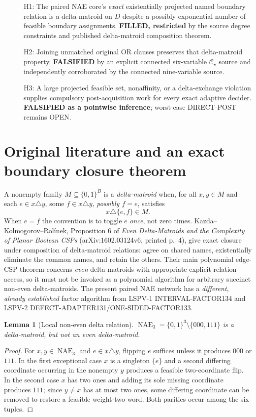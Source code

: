 \documentclass[11pt]{article}
\newtheorem{lemma}[theorem]{Lemma}
\newcommand{\CS}{\mathcal C_{\star}}
\newcommand{\NAE}{\operatorname{NAE}}
\begin{document}
\begin{description}
\item[] H1: The paired NAE core's \emph{exact} existentially projected named boundary relation is a delta-matroid on $D$ despite a possibly exponential number of feasible boundary assignments. \textbf{FILLED, restricted} by the source degree constraints and published delta-matroid composition theorem.
\item[] H2: Joining unmatched original OR clauses preserves that delta-matroid property. \textbf{FALSIFIED} by an explicit connected six-variable $\CS$ source and independently corroborated by the connected nine-variable source.
\item[] H3: A large projected feasible set, nonaffinity, or a delta-exchange violation supplies compulsory post-acquisition work for every exact adaptive decider. \textbf{FALSIFIED as a pointwise inference}; worst-case DIRECT-POST remains OPEN.
\end{description}

\section{Original literature and an exact boundary closure theorem}
A nonempty family $M\subseteq\{0,1\}^B$ is a \emph{delta-matroid} when, for all $x,y\in M$ and each $e\in x\triangle y$, some $f\in x\triangle y$, \emph{possibly $f=e$}, satisfies
\[
x\triangle\{e,f\}\in M.
\]
When $e=f$ the convention is to toggle $e$ \emph{once}, not zero times. Kazda--Kolmogorov--Rol\'inek, Proposition 6 of \emph{Even Delta-Matroids and the Complexity of Planar Boolean CSPs} (arXiv:1602.03124v6, printed p.~4), give exact closure under composition of delta-matroid relations: agree on shared names, existentially eliminate the common names, and retain the others. Their main polynomial edge-CSP theorem concerns \emph{even} delta-matroids with appropriate explicit relation access, so it must not be invoked as a polynomial algorithm for arbitrary succinct non-even delta-matroids. The present paired NAE network has a \emph{different, already established} factor algorithm from LSPV-1 INTERVAL-FACTOR134 and LSPV-2 DEFECT-ADAPTER131/ONE-SIDED-FACTOR133.

\begin{lemma}[Local non-even delta relation]
$\NAE_3=\{0,1\}^3\setminus\{000,111\}$ is a delta-matroid, but not an even delta-matroid.
\end{lemma}
\begin{proof}
For $x,y\in\NAE_3$ and $e\in x\triangle y$, flipping $e$ suffices unless it produces $000$ or $111$. In the first exceptional case $x$ is a singleton $\{e\}$ and a second differing coordinate occurring in the nonempty $y$ produces a feasible two-coordinate flip. In the second case $x$ has two ones and adding its sole missing coordinate produces $111$; since $y\ne x$ has at most two ones, some differing coordinate can be removed to restore a feasible weight-two word. Both parities occur among the six tuples.
\end{proof}
\end{document}
